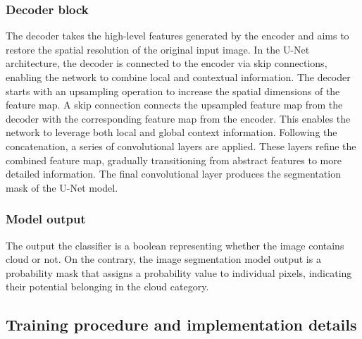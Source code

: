 \documentclass[amt, article]{copernicus}
\begin{document}
\subsubsection{Decoder block}

The decoder takes the high-level features generated by the encoder and aims to restore the spatial resolution of the original input image. In the U-Net architecture, the decoder is connected to the encoder via skip connections, enabling the network to combine local and contextual information. The decoder starts with an upsampling operation to increase the spatial dimensions of the feature map. A skip connection connects the upsampled feature map from the decoder with the corresponding feature map from the encoder. This enables the network to leverage both local and global context information. Following the concatenation, a series of convolutional layers are applied. These layers refine the combined feature map, gradually transitioning from abstract features to more detailed information. The final convolutional layer produces the segmentation mask of the U-Net model.

\subsubsection{Model output}

The output the classifier is a boolean representing whether the image contains cloud or not. On the contrary, the image segmentation model output is a probability mask that assigns a probability value to individual pixels, indicating their potential belonging in the cloud category.

\subsection{Training procedure and implementation details}
\end{document}
